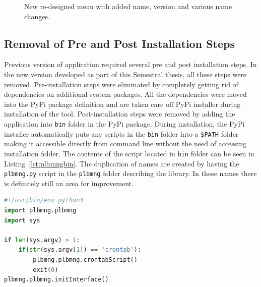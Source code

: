 \begin{figure}[H]
	\centering
	\caption{New re-designed menu with added name, version and various name changes.}
	\label{fig:redesigned}
\end{figure}

\subsection{Removal of Pre and Post Installation Steps}
Previous version of application required several pre and post installation steps. In the new version developed as part of this Semestral thesis, all these steps were removed. Pre-installation steps were eliminated by completely getting rid of dependencies on additional system packages. All the dependencies were moved into the PyPi package definition and are taken care off PyPi installer during installation of the tool. Post-installation steps were removed by adding the application into \texttt{bin} folder in the PyPi package. During installation, the PyPi installer automatically puts any scripts in the \texttt{bin} folder into a \texttt{\$PATH} folder making it accessible directly from command line without the need of accessing installation folder. The contents of the script located in \texttt{bin} folder can be seen in Listing~\ref{lst:plbmngbin}. The duplication of names are created by having the \texttt{plbmng.py} script in the \texttt{plbmng} folder describing the library. In these names there is definitely still an area for improvement.

\begin{minipage}{\linewidth}
\begin{lstlisting}[language=Python, numbers=none, label={lst:plbmngbin}, caption=Source Code of Plbmng Executable Script, frame=single, showstringspaces=false, breaklines=true]
#!/usr/bin/env python3
import plbmng.plbmng
import sys

if len(sys.argv) > 1:
	if(str(sys.argv[1]) == 'crontab'):
		plbmng.plbmng.crontabScript()
		exit(0)
plbmng.plbmng.initInterface()
\end{lstlisting}
\end{minipage}

